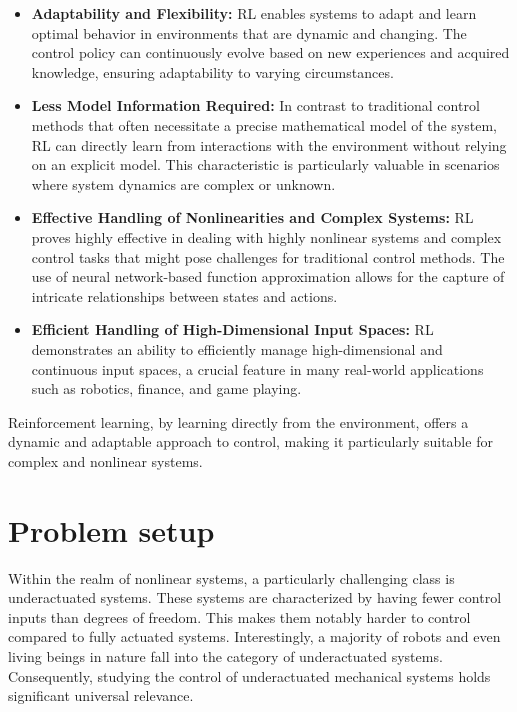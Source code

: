\begin{itemize}
    \item \textbf{Adaptability and Flexibility:}
    RL enables systems to adapt and learn optimal behavior in environments that are dynamic and changing. The control policy can continuously evolve based on new experiences and acquired knowledge, ensuring adaptability to varying circumstances.
    
    \item \textbf{Less Model Information Required:}
    In contrast to traditional control methods that often necessitate a precise mathematical model of the system, RL can directly learn from interactions with the environment without relying on an explicit model. This characteristic is particularly valuable in scenarios where system dynamics are complex or unknown.
    
    \item \textbf{Effective Handling of Nonlinearities and Complex Systems:}
    RL proves highly effective in dealing with highly nonlinear systems and complex control tasks that might pose challenges for traditional control methods. The use of neural network-based function approximation allows for the capture of intricate relationships between states and actions.
    
    \item \textbf{Efficient Handling of High-Dimensional Input Spaces:}
    RL demonstrates an ability to efficiently manage high-dimensional and continuous input spaces, a crucial feature in many real-world applications such as robotics, finance, and game playing.
\end{itemize}

Reinforcement learning, by learning directly from the environment, offers a dynamic and adaptable approach to control, making it particularly suitable for complex and nonlinear systems.


\section{Problem setup}
Within the realm of nonlinear systems, a particularly challenging class is underactuated systems. These systems are characterized by having fewer control inputs than degrees of freedom. This makes them notably harder to control compared to fully actuated systems. Interestingly, a majority of robots and even living beings in nature fall into the category of underactuated systems. Consequently, studying the control of underactuated mechanical systems holds significant universal relevance.

